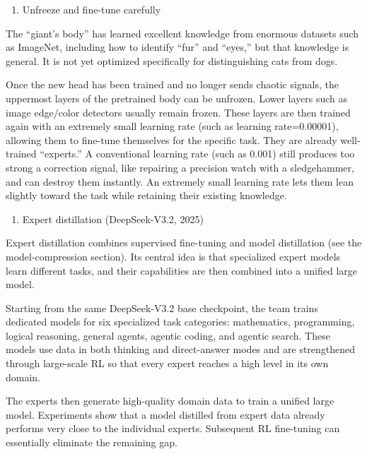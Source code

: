 \begin{enumerate}
\def\labelenumi{(\arabic{enumi})}
\setcounter{enumi}{3}
\tightlist
\item
  Unfreeze and fine-tune carefully
\end{enumerate}

The ``giant's body'' has learned excellent knowledge from enormous datasets such as ImageNet, including how to identify ``fur'' and ``eyes,'' but that knowledge is general. It is not yet optimized specifically for distinguishing cats from dogs.

Once the new head has been trained and no longer sends chaotic signals, the uppermost layers of the pretrained body can be unfrozen. Lower layers such as image edge/color detectors usually remain frozen. These layers are then trained again with an extremely small learning rate (such as learning rate=0.00001), allowing them to fine-tune themselves for the specific task. They are already well-trained ``experts.'' A conventional learning rate (such as 0.001) still produces too strong a correction signal, like repairing a precision watch with a sledgehammer, and can destroy them instantly. An extremely small learning rate lets them lean slightly toward the task while retaining their existing knowledge.

\begin{enumerate}
\def\labelenumi{\arabic{enumi}.}
\setcounter{enumi}{2}
\tightlist
\item
  Expert distillation (DeepSeek-V3.2, 2025)
\end{enumerate}

Expert distillation combines supervised fine-tuning and model distillation (see the model-compression section). Its central idea is that specialized expert models learn different tasks, and their capabilities are then combined into a unified large model.

Starting from the same DeepSeek-V3.2 base checkpoint, the team trains dedicated models for six specialized task categories: mathematics, programming, logical reasoning, general agents, agentic coding, and agentic search. These models use data in both thinking and direct-answer modes and are strengthened through large-scale RL so that every expert reaches a high level in its own domain.

The experts then generate high-quality domain data to train a unified large model. Experiments show that a model distilled from expert data already performs very close to the individual experts. Subsequent RL fine-tuning can essentially eliminate the remaining gap.

